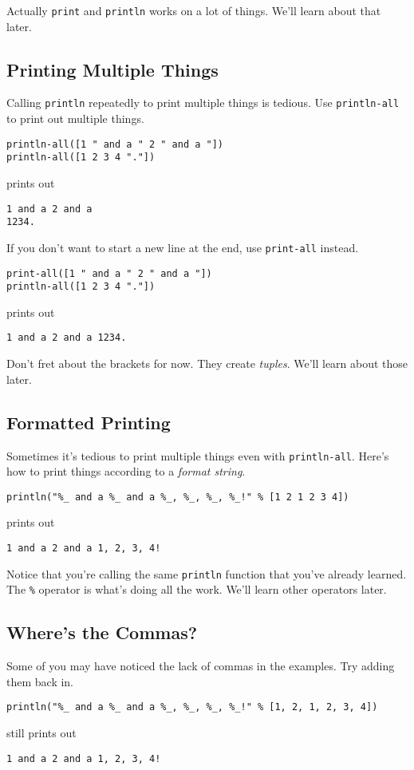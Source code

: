 \documentclass[10pt,oneside]{book}
\begin{document}
Actually \texttt{\frenchspacing print} and \texttt{\frenchspacing println} works on a lot of things. We'll learn about that later.

\subsection*{Printing Multiple Things}
Calling \texttt{\frenchspacing println} repeatedly to print multiple things is tedious. Use \texttt{\frenchspacing println-all} to print out multiple things.
\begin{lstlisting}
println-all([1 " and a " 2 " and a "])
println-all([1 2 3 4 "."])
\end{lstlisting}
prints out
\begin{lstlisting}
1 and a 2 and a 
1234.
\end{lstlisting}

If you don't want to start a new line at the end, use \texttt{\frenchspacing print-all} instead.
\begin{lstlisting}
print-all([1 " and a " 2 " and a "])
println-all([1 2 3 4 "."])
\end{lstlisting}
prints out
\begin{lstlisting}
1 and a 2 and a 1234.
\end{lstlisting}

Don't fret about the \texttt{\frenchspacing []} brackets for now. They create {\em tuples}. We'll learn about those later.

\subsection*{Formatted Printing}
Sometimes it's tedious to print multiple things even with \texttt{\frenchspacing println-all}. Here's how to print things according to a {\em format string}.
\begin{lstlisting}
println("%_ and a %_ and a %_, %_, %_, %_!" % [1 2 1 2 3 4])
\end{lstlisting}
prints out
\begin{lstlisting}
1 and a 2 and a 1, 2, 3, 4!
\end{lstlisting}

Notice that you're calling the same \texttt{\frenchspacing println} function that you've already learned. The \texttt{\frenchspacing \%} operator is what's doing all the work. We'll learn other operators later.

\subsection*{Where's the Commas?}
Some of you may have noticed the lack of commas in the examples. Try adding them back in.
\begin{lstlisting}
println("%_ and a %_ and a %_, %_, %_, %_!" % [1, 2, 1, 2, 3, 4])
\end{lstlisting}
still prints out
\begin{lstlisting}
1 and a 2 and a 1, 2, 3, 4!
\end{lstlisting}
\end{document}
